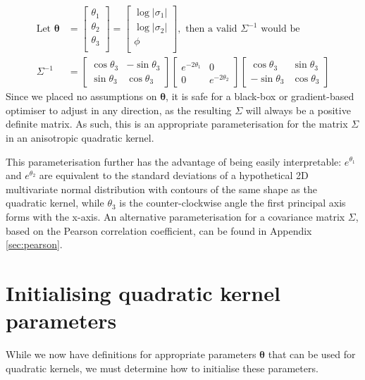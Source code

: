 \documentclass[a4paper, 12pt]{report}
\begin{document}
\begin{align}
\textrm{Let }\boldsymbol{\theta}&=\begin{bmatrix}
	\theta_1\\
	\theta_2\\
	\theta_3\\
\end{bmatrix}=\begin{bmatrix}
	\log|\sigma_1| \\
	\log|\sigma_2|\\
	\phi\\
\end{bmatrix}, \textrm{ then a valid $\Sigma^{-1}$ would be} \\
\Sigma^{-1} &= \begin{bmatrix}
	\cos \theta_3 & -\sin \theta_3 \\ \sin\theta_3 & \cos\theta_3
\end{bmatrix}\begin{bmatrix}
	 e^{-2\theta_1} & 0\\ 0 &  e^{-2\theta_2}
\end{bmatrix} \begin{bmatrix}
	\cos \theta_3 & \sin \theta_3 \\ -\sin\theta_3 & \cos\theta_3
\end{bmatrix}
\end{align}
Since we placed no assumptions on $\boldsymbol{\theta}$, it is safe for a black-box or gradient-based optimiser to adjust in any direction, as the resulting $\Sigma$ will always be a positive definite matrix. As such, this is an appropriate parameterisation for the matrix $\Sigma$ in an anisotropic quadratic kernel.

This parameterisation further has the advantage of being easily interpretable: $e^{\theta_1}$ and $e^{\theta_2}$ are equivalent to the standard deviations of a hypothetical 2D multivariate normal distribution with contours of the same shape as the quadratic kernel, while $\theta_3$ is the counter-clockwise angle the first principal axis forms with the x-axis. An alternative parameterisation for a covariance matrix $\Sigma$, based on the Pearson correlation coefficient, can be found in Appendix \ref{sec:pearson}.


\newpage
\section{Initialising quadratic kernel parameters}

While we now have definitions for appropriate parameters $\boldsymbol{\theta}$ that can be used for quadratic kernels, we must determine how to initialise these parameters.
\end{document}
